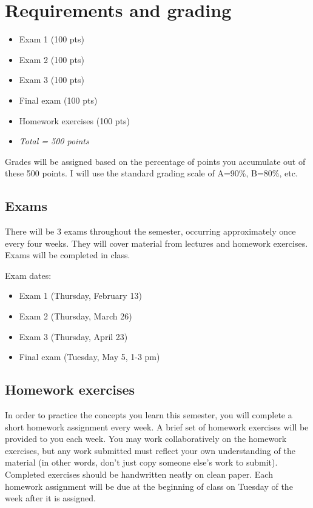 \documentclass[10pt]{article}
\begin{document}
\section*{Requirements and grading}
\label{sec:orgcbe12dc}
\begin{itemize}
\item Exam 1 (100 pts)
\item Exam 2 (100 pts)
\item Exam 3 (100 pts)
\item Final exam (100 pts)
\item Homework exercises (100 pts)
\item \emph{Total = 500 points}
\end{itemize}

Grades will be assigned based on the percentage of points you accumulate out of these 500 points.  I will use the standard grading scale of A=90\%, B=80\%, etc.

\subsection*{Exams}
\label{sec:org7a4775d}
There will be 3 exams throughout the semester, occurring approximately once every four weeks.  They will cover material from lectures and homework exercises. Exams will be completed in class.

Exam dates:

\begin{itemize}
\item Exam 1 (Thursday, February 13)
\item Exam 2 (Thursday, March 26)
\item Exam 3 (Thursday, April 23)
\item Final exam (Tuesday, May 5, 1-3 pm)
\end{itemize}

\subsection*{Homework exercises}
\label{sec:org3b7fba3}
In order to practice the concepts you learn this semester, you will complete a short homework assignment every week. A brief set of homework exercises will be provided to you each week. You may work collaboratively on the homework exercises, but any work submitted must reflect your own understanding of the material (in other words, don't just copy someone else's work to submit). Completed exercises should be handwritten neatly on clean paper. Each homework assignment will be due at the beginning of class on Tuesday of the week after it is assigned.
\end{document}

